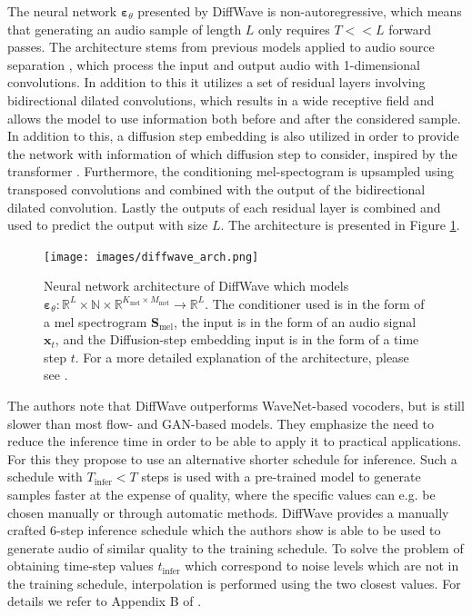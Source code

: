 \documentclass{report}
\begin{document}
The neural network $\bm{\varepsilon}_{\theta}$ presented by DiffWave is non-autoregressive, which means that generating an audio sample of length $L$ only requires $T << L$ forward passes. The architecture stems from previous models applied to audio source separation \cite{rethage2018wavenet}, which process the input and output audio with 1-dimensional convolutions. In addition to this it utilizes a set of residual layers involving bidirectional dilated convolutions, which results in a wide receptive field and allows the model to use information both before and after the considered sample. In addition to this, a diffusion step embedding is also utilized in order to provide the network with information of which diffusion step to consider, inspired by the transformer \cite{vaswani2017attention}. Furthermore, the conditioning mel-spectogram is upsampled using transposed convolutions and combined with the output of the bidirectional dilated convolution. Lastly the outputs of each residual layer is combined and used to predict the output with size $L$. The architecture is presented in Figure \ref{fig:diffwavearch}.

\begin{figure}[H]
    \centering
    \texttt{[image: images/diffwave\_arch.png]}
    \caption{\onehalfspacing Neural network architecture of DiffWave which models $\bm{\varepsilon}_{\theta}: \mathbb{R}^L \times \mathbb{N} \times\mathbb{R}^{K_{\text{mel}} \times M_{\text{mel}}} \to \mathbb{R}^L$. The conditioner used is in the form of a mel spectrogram $\bm{S}_{\text{mel}}$, the input is in the form of an audio signal $\bm{x}_t$, and the Diffusion-step embedding input is in the form of a time step $t$. For a more detailed explanation of the architecture, please see \cite{kong2020diffwave}.}
    \label{fig:diffwavearch}
\end{figure}

The authors note that DiffWave outperforms WaveNet-based vocoders, but is still slower than most flow- and GAN-based models. They emphasize the need to reduce the inference time in order to be able to apply it to practical applications. For this they propose to use an alternative shorter schedule for inference. Such a schedule with $T_{\text{infer}} < T$ steps is used with a pre-trained model to generate samples faster at the expense of quality, where the specific values can e.g. be chosen manually or through automatic methods. DiffWave provides a manually crafted 6-step inference schedule which the authors show is able to be used to generate audio of similar quality to the training schedule. To solve the problem of obtaining time-step values $t_{\text{infer}}$ which correspond to noise levels which are not in the training schedule, interpolation is performed using the two closest values. For details we refer to Appendix B of \cite{kong2020diffwave}.
\end{document}
